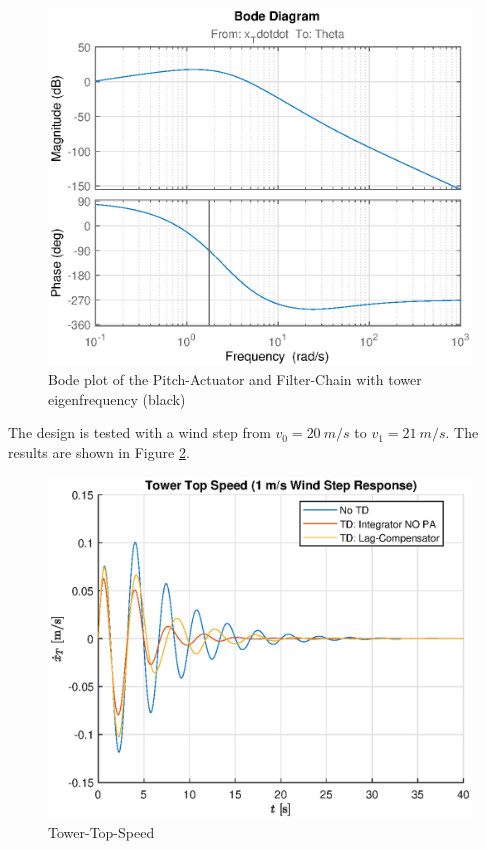 \begin{figure}[h]
	\centering	
	\includegraphics[width=12cm]{Figures/BodeSystem.eps}
	\caption{Bode plot of the Pitch-Actuator and Filter-Chain with tower eigenfrequency (black)}
	\label{fig:SystemBode}
\end{figure} 


The design is tested with a wind step from $v_0 = \SI{20}{m/s}$ to $v_1 = \SI{21}{m/s}$. The results are shown in Figure \ref{fig:TDWindStep}.

\begin{figure}[h]
	\centering	
	\includegraphics[width=12cm]{Figures/WindStep.eps}
	\caption{Tower-Top-Speed}
	\label{fig:TDWindStep}
\end{figure}

